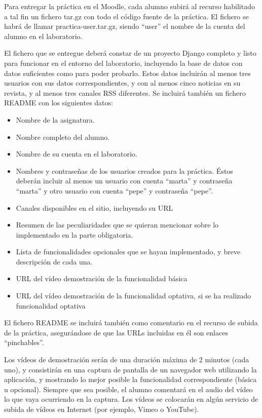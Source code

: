 Para entregar la práctica en el Moodle, cada alumno subirá al recurso habilitado a tal fin un fichero tar.gz con todo el código fuente de la práctica. El fichero se habrá de llamar practica-user.tar.gz, siendo ``user'' el nombre de la cuenta del alumno en el laboratorio.

El fichero que se entregue deberá constar de un proyecto Django completo y listo para funcionar en el entorno del laboratorio, incluyendo la base de datos con datos suficientes como para poder probarlo. Estos datos incluirán al menos tres usuarios con sus datos correspondientes, y con al menos cinco noticias en su revista, y al menos tres canales RSS diferentes. Se incluirá también un fichero README con los siguientes datos:

\begin{itemize}
\item Nombre de la asignatura.
\item Nombre completo del alumno.
\item Nombre de su cuenta en el laboratorio.
\item Nombres y contraseñas de los usuarios creados para la práctica. Éstos deberán incluir al menos un usuario con cuenta ``marta'' y contraseña ``marta'' y otro usuario con cuenta ``pepe'' y contraseña ``pepe''.
\item Canales disponibles en el sitio, incluyendo su URL
\item Resumen de las peculiaridades que se quieran mencionar sobre lo implementado en la parte obligatoria.
\item Lista de funcionalidades opcionales que se hayan implementado, y breve descripción de cada una.
\item URL del vídeo demostración de la funcionalidad básica
\item URL del vídeo demostración de la funcionalidad optativa, si se ha realizado funcionalidad optativa
\end{itemize}

El fichero README se incluirá también como comentario en el recurso de subida de la práctica, asegurándose de que las URLs incluidas en él son enlaces ``pinchables''.

Los vídeos de demostración serán de una duración máxima de 2 minutos (cada uno), y consistirán en una captura de pantalla de un navegador web utilizando la aplicación, y mostrando lo mejor posible la funcionalidad correspondiente (básica u opcional). Siempre que sea posible, el alumno comentará en el audio del vídeo lo que vaya ocurriendo en la captura. Los vídeos se colocarán en algún servicio de subida de vídeos en Internet (por ejemplo, Vimeo o YouTube).


